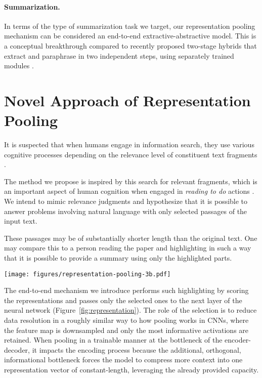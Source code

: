 \documentclass{article}
\begin{document}
\paragraph{Summarization.} 

In terms of the type of summarization task we target, our representation pooling mechanism can be considered an end-to-end extractive-abstractive model. This is a conceptual breakthrough compared to recently proposed two-stage hybrids that extract and paraphrase in two independent steps, using separately trained modules \citep{s2019extractive, hsu2018unified, gehrmann2018bottomup, chen2018fast}.



\section{Novel Approach of Representation Pooling}
It is suspected that when humans engage in information search, they use various cognitive processes depending on the relevance level of constituent text fragments \citep{asi.23904}.

The method we propose is inspired by this search for relevant fragments, which is an important aspect of human cognition when engaged in \textit{reading to do} actions 
\citep{mosenthal1996understanding,10.2307/40032191}. 
 We intend to mimic relevance judgments and hypothesize that it is possible to answer problems involving natural language with only selected passages of the input text.

These passages may be of substantially shorter length than the original text.
One may compare this to a person reading the paper and highlighting in such a way that it is possible to provide a summary using only the highlighted parts.

\begin{figure*}
    \centering
    \texttt{[image: figures/representation-pooling-3b.pdf]} \caption{
        Transpooler architecture with pooling after one encoder layer. Each representation is scored, and then only those with the highest scores are passed to the decoder. Encoding can be performed on the full length input or in blocks of fixed length.}
    \label{fig:representation}
\end{figure*}

 The end-to-end mechanism we introduce performs such highlighting by 
scoring the representations and passes only the selected ones to the next layer of the neural network (Figure~\ref{fig:representation}). The role of the selection is to reduce data resolution in a roughly similar way to how pooling works in CNNs, where the feature map is downsampled and only the most informative activations are retained. When pooling in a trainable manner at the bottleneck of the encoder-decoder, it impacts the encoding process because the additional, orthogonal, informational bottleneck forces the model to compress more context into one representation vector of constant-length, leveraging the already provided capacity.
\end{document}
